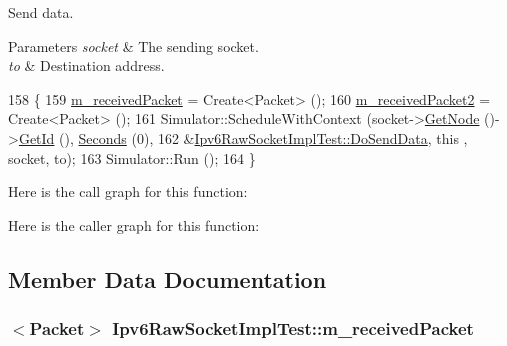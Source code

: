 Send data. 


\begin{DoxyParams}{Parameters}
{\em socket} & The sending socket. \\
\hline
{\em to} & Destination address. \\
\hline
\end{DoxyParams}

\begin{DoxyCode}
158 \{
159   \hyperlink{classIpv6RawSocketImplTest_a57057bfb5f48de92165d7c3dfb8ff7ea}{m\_receivedPacket} = Create<Packet> ();
160   \hyperlink{classIpv6RawSocketImplTest_a1b23c24c9271e6874968546857829676}{m\_receivedPacket2} = Create<Packet> ();
161   Simulator::ScheduleWithContext (socket->\hyperlink{classns3_1_1Socket_aba642ad4301c1df47befc0aa9afa2e48}{GetNode} ()->\hyperlink{classns3_1_1Node_aaf49b64a843565ce3812326313b370ac}{GetId} (), 
      \hyperlink{group__timecivil_ga33c34b816f8ff6628e33d5c8e9713b9e}{Seconds} (0),
162                                   &\hyperlink{classIpv6RawSocketImplTest_a8740040a2cbd85d22d3bcfd2f68f9215}{Ipv6RawSocketImplTest::DoSendData}, \textcolor{keyword}{this}
      , socket, to);
163   Simulator::Run ();
164 \}
\end{DoxyCode}


Here is the call graph for this function\+:




Here is the caller graph for this function\+:




\subsection{Member Data Documentation}
\subsubsection[{\texorpdfstring{m\+\_\+received\+Packet}{m_receivedPacket}}]{$<${\bf Packet}$>$ Ipv6\+Raw\+Socket\+Impl\+Test\+::m\+\_\+received\+Packet\hspace{0.3cm}{\ttfamily [private]}}\hypertarget{classIpv6RawSocketImplTest_a57057bfb5f48de92165d7c3dfb8ff7ea}{}\label{classIpv6RawSocketImplTest_a57057bfb5f48de92165d7c3dfb8ff7ea}


